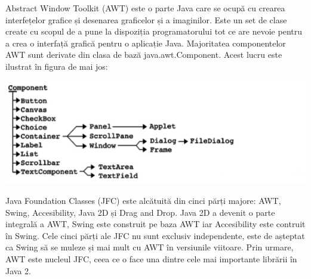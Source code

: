 \documentclass[12pt]{book}
\begin{document}
Abstract Window Toolkit (AWT) este o parte Java care se ocupă cu crearea interfețelor grafice și desenarea graficelor și a imaginilor. Este un set de clase create cu scopul de a pune la dispoziția programatorului tot ce are nevoie pentru a crea o interfață grafică pentru o aplicație Java. Majoritatea componentelor AWT sunt derivate din clasa de bază java.awt.Component. Acest lucru este ilustrat în figura de mai jos:
\begin{center}
	\includegraphics{awt}
	\cite{swingBook}
\end{center}

Java Foundation Classes (JFC) este alcătuită din cinci părți majore: AWT, Swing, Accesibility, Java 2D și Drag and Drop. Java 2D a devenit o parte integrală a AWT, Swing este construit pe baza AWT iar Accesibility este contruit în Swing. Cele cinci părți ale JFC nu sunt exclusiv independente, este de așteptat ca Swing să se muleze și mai mult cu AWT în versiunile viitoare. Prin urmare, AWT este nucleul JFC, ceea ce o face una dintre cele mai importante librării în Java 2.
\end{document}
